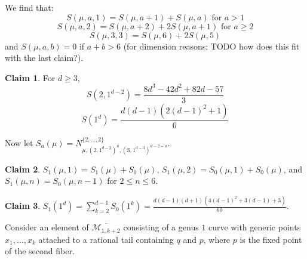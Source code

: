 \documentclass[11pt]{article}           %
\theoremstyle{definition}
\newtheorem*{claim}{Claim}
\theoremstyle{definition}
\begin{document}
We find that:
\[
S(\mu,a,1)=S(\mu,a+1)+S(\mu,a)\text{ for $a>1$}
\]
\[
S(\mu,a,2)=S(\mu,a+2)+2S(\mu,a+1)\text{ for $a\geq 2$}
\]
\[
S(\mu,3,3)=S(\mu,6)+2S(\mu,5)
\]
and $S(\mu,a,b)=0$ if $a+b>6$ (for dimension reasons; TODO how does this fit with the last claim?).

\begin{claim}
  For $d\geq 3$,
  \[
  S(2,1^{d-2})=\frac{8d^3-42d^2+82d-57}{3}
  \]
  \[
  S(1^d)=\frac{d(d-1)(2(d-1)^2+1)}{6}
  \]
\end{claim}

Now let $S_a(\mu)=N_{\mu,(2,1^{d-2})^a,(3,1^{d-3})^{d-2-a}}^{\{2,\dots,2\}}$.

\begin{claim}
  $S_1(\mu,1)=S_1(\mu)+S_0(\mu)$, $S_1(\mu,2)=S_0(\mu,1)+S_0(\mu)$, and $S_1(\mu,n)=S_0(\mu,n-1)$
  for $2\leq n\leq 6$.
\end{claim}

\begin{claim}
  $S_1(1^d)=\sum_{k=2}^{d-1}S_0(1^k)=\frac{d(d-1)(d+1)(4(d-1)^2+3(d-1)+3)}{60}$.
  \end{claim}

Consider an element of $\overline{\mathcal M_{1,k+2}}$ consisting of a genus $1$ curve
with generic points $x_1,\dots,x_k$ attached to a rational tail containing $q$ and $p$, where
$p$ is the fixed point of the second fiber.
\end{document}
